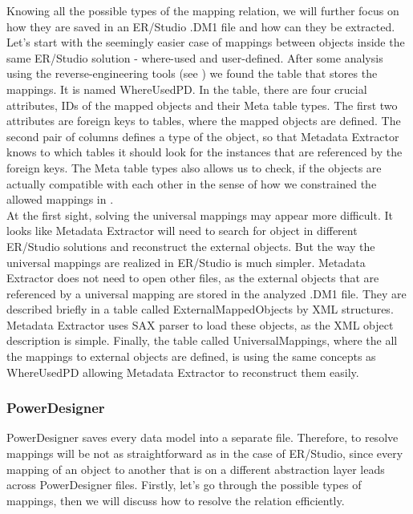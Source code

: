 Knowing all the possible types of the mapping relation, we will further focus on how they are saved in an ER/Studio .DM1 file and how can they be extracted. \\ 

Let's start with the seemingly easier case of mappings between objects inside the same ER/Studio solution - where-used and user-defined. 
After some analysis using the reverse-engineering tools (see ) we found the table that stores the mappings. It is named Where\textunderscore Used\textunderscore PD.
In the table, there are four crucial attributes, IDs of the mapped objects and their Meta table types.
The first two attributes are foreign keys to tables, where the mapped objects are defined. The second pair of columns defines a type of the object, so that Metadata Extractor knows to which tables it should look for the instances that are referenced by the foreign keys. 
The Meta table types also allows us to check, if the objects are actually compatible with each other in the sense of how we constrained the allowed mappings in . \\

At the first sight, solving the universal mappings may appear more difficult. It looks like Metadata Extractor will need to search for object in different ER/Studio solutions and reconstruct the external objects. 
But the way the universal mappings are realized in ER/Studio is much simpler. 
Metadata Extractor does not need to open other files, as the external objects that are referenced by a universal mapping are stored in the analyzed .DM1 file. 
They are described briefly in a table called External\textunderscore Mapped\textunderscore Objects by XML structures.
Metadata Extractor uses SAX parser to load these objects, as the XML object description is simple.
Finally, the table called Universal\textunderscore Mappings, where the all the mappings to external objects are defined, is using the same concepts as Where\textunderscore Used\textunderscore PD allowing Metadata Extractor to reconstruct them easily.

\subsubsection{PowerDesigner}

PowerDesigner saves every data model into a separate file. Therefore, to resolve mappings will be not as straightforward as in the case of ER/Studio, since every mapping of an object to another that is on a different abstraction layer leads across PowerDesigner files.
Firstly, let's go through the possible types of mappings, then we will discuss how to resolve the relation efficiently.

